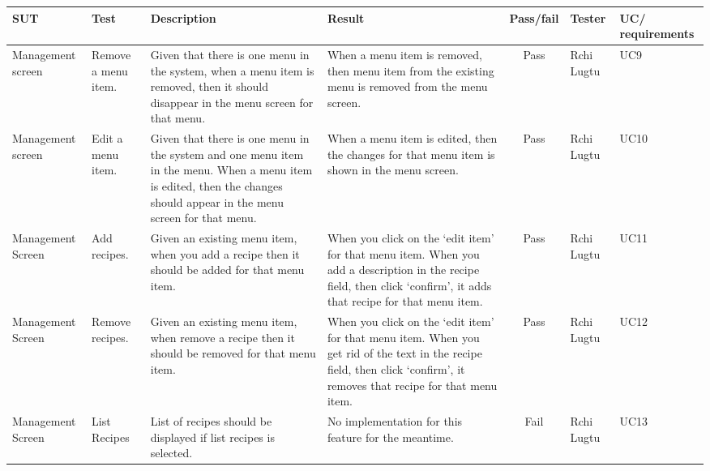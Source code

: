 \begin{tabularx}{\linewidth}{|X|X|X|X|c|X|X|}
\hline
SUT & Test & Description & Result & Pass/fail & Tester & UC/ requirements \\
\hline
Management screen & Remove a menu item. & Given that there is one menu in the system, when a menu item is removed, then it should disappear in the menu screen for that menu. & When a menu item is removed, then menu item from the existing menu is removed from the menu screen. & Pass & Rchi Lugtu & UC9 \\
\hline
Management screen & Edit a menu item. & Given that there is one menu in the system and one menu item in the menu. When a menu item is edited, then the changes should appear in the menu screen for that menu. & When a menu item is edited, then the changes for that menu item is shown in the menu screen. & Pass & Rchi Lugtu & UC10 \\
\hline
Management Screen & Add recipes. & Given an existing menu item, when you add a recipe then it should be added for that menu item. & When you click on the ‘edit item’ for that menu item. When you add a description in the recipe field, then click ‘confirm’, it adds that recipe for that menu item. & Pass & Rchi Lugtu & UC11 \\
\hline
Management Screen & Remove recipes. & Given an existing menu item, when remove a recipe then it should be removed for that menu item. & When you click on the ‘edit item’ for that menu item. When you get rid of the text in the recipe field, then click ‘confirm’, it removes that recipe for that menu item. & Pass & Rchi Lugtu & UC12 \\
\hline
Management Screen & List Recipes & List of recipes should be displayed if list recipes is selected. & No implementation for this feature for the meantime. & Fail & Rchi Lugtu & UC13 \\
\hline
\end{tabularx}
